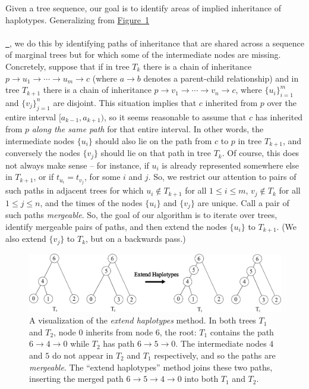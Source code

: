 \documentclass[10pt,twoside,lineno]{gsajnl}
\newcommand*{\figref}[2][]{%
	\hyperref[{#2}]{%
		Figure~\ref*{#2}%
		\ifx\\#1\\%
		\else
		\,#1%
		\fi
	}%
}
\begin{document}
Given a tree sequence, our goal is to
identify areas of implied inheritance of haplotypes.
Generalizing from \figref{fig:extending_diagram},
we do this by identifying paths of inheritance that are shared across a sequence of marginal trees
but for which some of the intermediate nodes are missing.
Concretely, suppose that 
if in tree $T_k$ there is a chain of inheritance
$p \to u_1 \to \cdots \to u_m \to c$
(where $a \to b$ denotes a parent-child relationship)
and in tree $T_{k+1}$ there is a chain of inheritance
$p \to v_1 \to \cdots \to v_n \to c$,
where $\{u_i\}_{i=1}^m$ and $\{v_j\}_{j=1}^n$ are disjoint.
This situation implies that $c$ inherited from $p$ over the entire interval $[a_{k-1}, a_{k+1})$,
so it seems reasonable to assume that $c$ has inherited from $p$ \emph{along the same path} for that entire interval.
In other words, the intermediate nodes $\{u_i\}$ should also lie on the path from $c$ to $p$ in tree $T_{k+1}$,
and conversely the nodes $\{v_j\}$ should lie on that path in tree $T_k$.
Of course, this does not always make sense --
for instance, if $u_i$ is already represented somewhere else in $T_{k+1}$,
or if $t_{u_i} = t_{v_j}$, for some $i$ and $j$.
So, we restrict our attention to pairs of such paths in adjacent trees
for which
$u_i \notin T_{k+1}$ for all $1 \le i \le m$,
$v_j \notin T_k$ for all $1 \le j \le n$,
and the times of the nodes $\{u_i\}$ and $\{v_j\}$ are unique.
Call a pair of such paths \emph{mergeable}.
So, the goal of our algorithm is to iterate over trees,
identify mergeable pairs of paths,
and then extend the nodes $\{u_i\}$ to $T_{k+1}$.
(We also extend $\{v_j\}$ to $T_k$, but on a backwards pass.)

\begin{figure}[!ht]
\begin{center}
	\includegraphics[width=5in]{edge_extend_method.pdf}
\end{center}
\caption{A visualization of the \textit{extend haplotypes} method.
    In both trees $T_1$ and $T_2$,
    node 0 inherits from node 6, the root:
    $T_1$ contains the path $6\to 4\to 0$ while $T_2$ has path $6\to 5\to 0$.
    The intermediate nodes $4$ and $5$ do not appear in $T_2$ and $T_1$ respectively, and so the paths are \textit{mergeable}.
    The ``extend haplotypes'' method joins these two paths,
    inserting the merged path $6\to 5\to 4\to 0$ into both $T_1$ and $T_2$.
    \label{fig:extending_diagram}
}
\end{figure}
\end{document}
